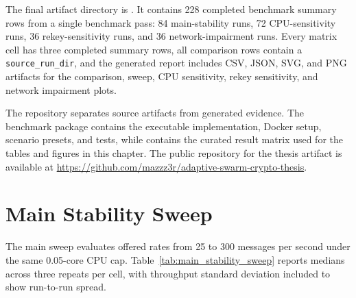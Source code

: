 The final artifact directory is . It contains 228 completed benchmark summary rows from a single benchmark pass: 84 main-stability runs, 72 CPU-sensitivity runs, 36 rekey-sensitivity runs, and 36 network-impairment runs. Every matrix cell has three completed summary rows, all comparison rows contain a \texttt{source\_run\_dir}, and the generated report includes CSV, JSON, SVG, and PNG artifacts for the comparison, sweep, CPU sensitivity, rekey sensitivity, and network impairment plots.

The repository separates source artifacts from generated evidence. The benchmark package contains the executable implementation, Docker setup, scenario presets, and tests, while  contains the curated result matrix used for the tables and figures in this chapter. The public repository for the thesis artifact is available at \url{https://github.com/mazzz3r/adaptive-swarm-crypto-thesis}.

\section{Main Stability Sweep}
\label{sec:saturation_results}

The main sweep evaluates offered rates from 25 to 300 messages per second under the same 0.05-core CPU cap. Table~\ref{tab:main_stability_sweep} reports medians across three repeats per cell, with throughput standard deviation included to show run-to-run spread.

